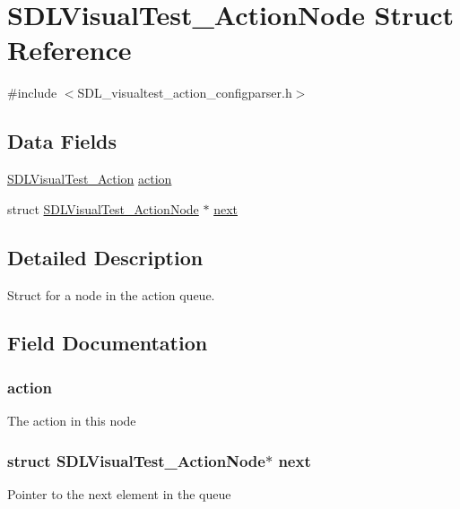 \hypertarget{struct_s_d_l_visual_test___action_node}{\section{S\-D\-L\-Visual\-Test\-\_\-\-Action\-Node Struct Reference}
\label{struct_s_d_l_visual_test___action_node}
}


{\ttfamily \#include $<$S\-D\-L\-\_\-visualtest\-\_\-action\-\_\-configparser.\-h$>$}

\subsection*{Data Fields}
\begin{DoxyCompactItemize}
\item 
\hyperlink{struct_s_d_l_visual_test___action}{S\-D\-L\-Visual\-Test\-\_\-\-Action} \hyperlink{struct_s_d_l_visual_test___action_node_af46ec45094cc74a7432626a6234c6575}{action}
\item 
struct \hyperlink{struct_s_d_l_visual_test___action_node}{S\-D\-L\-Visual\-Test\-\_\-\-Action\-Node} $\ast$ \hyperlink{struct_s_d_l_visual_test___action_node_ae6154b60b896ce1a184d060ee4664485}{next}
\end{DoxyCompactItemize}


\subsection{Detailed Description}
Struct for a node in the action queue. 

\subsection{Field Documentation}
\hypertarget{struct_s_d_l_visual_test___action_node_af46ec45094cc74a7432626a6234c6575}{
\subsubsection[{action}]{ action}}\label{struct_s_d_l_visual_test___action_node_af46ec45094cc74a7432626a6234c6575}
The action in this node \hypertarget{struct_s_d_l_visual_test___action_node_ae6154b60b896ce1a184d060ee4664485}{
\subsubsection[{next}]{\setlength{\rightskip}{0pt plus 5cm}struct {\bf S\-D\-L\-Visual\-Test\-\_\-\-Action\-Node}$\ast$ next}}\label{struct_s_d_l_visual_test___action_node_ae6154b60b896ce1a184d060ee4664485}
Pointer to the next element in the queue 

